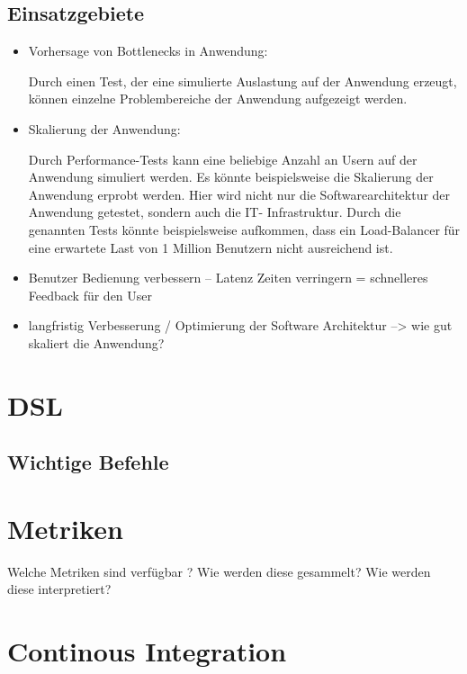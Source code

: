 \subsection{Einsatzgebiete}

\begin{itemize}
    \item Vorhersage von Bottlenecks in Anwendung:
    
    Durch einen Test, der eine simulierte Auslastung auf der Anwendung erzeugt, können einzelne Problembereiche der Anwendung aufgezeigt werden.
    \item Skalierung der Anwendung:

    Durch Performance-Tests kann eine beliebige Anzahl an Usern auf der Anwendung simuliert werden. Es könnte beispielsweise die Skalierung der Anwendung erprobt werden. Hier wird nicht nur die Softwarearchitektur der Anwendung getestet, sondern auch die IT- Infrastruktur. Durch die genannten Tests könnte beispielsweise aufkommen, dass ein Load-Balancer für eine erwartete Last von 1 Million Benutzern nicht ausreichend ist.
    \item Benutzer Bedienung verbessern -- Latenz Zeiten verringern = schnelleres Feedback für den User
    \item langfristig Verbesserung / Optimierung der Software Architektur  --> wie gut skaliert die Anwendung?

\end{itemize}


\section{DSL}


\subsection{Wichtige Befehle}



\section{Metriken}

Welche Metriken sind verfügbar ?
Wie werden diese gesammelt?
Wie werden diese interpretiert?




\section{Continous Integration}

